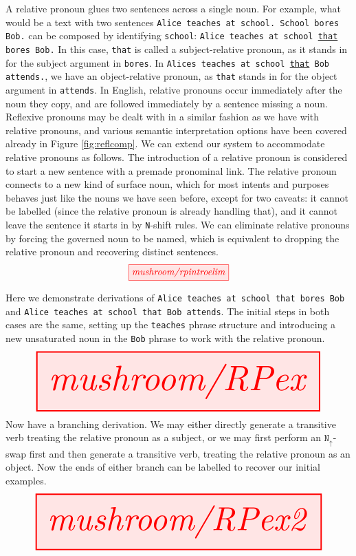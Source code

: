 \clearpage
\newpage

\begin{myboxB}
\begin{rules}\label{rules:relpron}
A relative pronoun glues two sentences across a single noun. For example, what would be a text with two sentences \texttt{Alice teaches at school. School bores Bob.} can be composed by identifying \texttt{school}: \texttt{Alice teaches at school \underline{that} bores Bob.} In this case, \texttt{that} is called a subject-relative pronoun, as it stands in for the subject argument in \texttt{bores}. In \texttt{Alices teaches at school \underline{that} Bob attends.}, we have an object-relative pronoun, as \texttt{that} stands in for the object argument in \texttt{attends}. In English, relative pronouns occur immediately after the noun they copy, and are followed immediately by a sentence missing a noun. Reflexive pronouns may be dealt with in a similar fashion as we have with relative pronouns, and various semantic interpretation options have been covered already in Figure \ref{fig:reflcomp}. We can extend our system to accommodate relative pronouns as follows. The introduction of a relative pronoun is considered to start a new sentence with a premade pronominal link. The relative pronoun connects to a new kind of surface noun, which for most intents and purposes behaves just like the nouns we have seen before, except for two caveats: it cannot be labelled (since the relative pronoun is already handling that), and it cannot leave the sentence it starts in by \texttt{N}-shift rules. We can eliminate relative pronouns by forcing the governed noun to be named, which is equivalent to dropping the relative pronoun and recovering distinct sentences.
\[\tikzfig{mushroom/rpintroelim}\]
\end{rules}
\end{myboxB}

\begin{myboxR}
\begin{example}\label{ex:relpron}
Here we demonstrate derivations of \texttt{Alice teaches at school that bores Bob} and \texttt{Alice teaches at school that Bob attends}. The initial steps in both cases are the same, setting up the \texttt{teaches} phrase structure and introducing a new unsaturated noun in the \texttt{Bob} phrase to work with the relative pronoun.
\[\resizebox{\textwidth}{!}{\tikzfig{mushroom/RPex}}\]
Now have a branching derivation. We may either directly generate a transitive verb treating the relative pronoun as a subject, or we may first perform an $\texttt{N}_\uparrow$-swap first and then generate a transitive verb, treating the relative pronoun as an object. Now the ends of either branch can be labelled to recover our initial examples.
\[\resizebox{\textwidth}{!}{\tikzfig{mushroom/RPex2}}\]
\end{example}
\end{myboxR}

